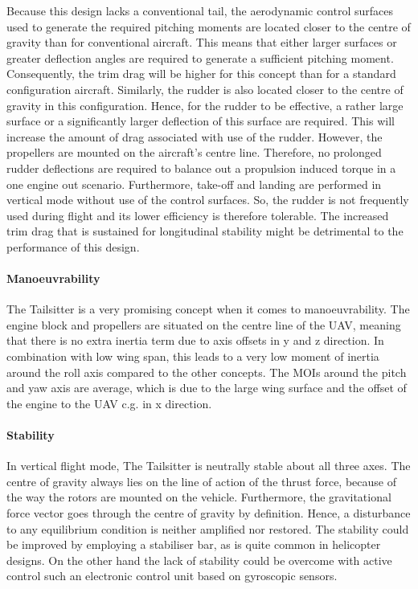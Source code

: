 Because this design lacks a conventional tail, the aerodynamic control surfaces used to generate the required pitching moments are located closer to the centre of gravity than for conventional aircraft. This means that either larger surfaces or greater deflection angles are required to generate a sufficient pitching moment. Consequently, the trim drag will be higher for this concept than for a standard configuration aircraft. Similarly, the rudder is also located closer to the centre of gravity in this configuration. Hence, for the rudder to be effective, a rather large surface or a significantly larger deflection of this surface are required. This will increase the amount of drag associated with use of the rudder. However, the propellers are mounted on the aircraft's centre line. Therefore, no prolonged rudder deflections are required to balance out a propulsion induced torque in a one engine out scenario. Furthermore, take-off and landing are performed in vertical mode without use of the control surfaces. So, the rudder is not frequently used during flight and its lower efficiency is therefore tolerable. The increased trim drag that is sustained for longitudinal stability might be detrimental to the performance of this design. 


\paragraph{Manoeuvrability}

The Tailsitter is a very promising concept when it comes to manoeuvrability. The engine block and propellers are situated on the centre line of the UAV, meaning that there is no extra inertia term due to axis offsets in y and z direction. In combination with low wing span, this leads to a very low moment of inertia around the roll axis compared to the other concepts. The MOIs around the pitch and yaw axis are average, which is due to the large wing surface and the offset of the engine to the UAV c.g. in x direction. 

\paragraph{Stability}

In vertical flight mode, The Tailsitter is neutrally stable about all three axes. The centre of gravity always lies on the line of action of the thrust force, because of the way the rotors are mounted on the vehicle. Furthermore, the gravitational force vector goes through the centre of gravity by definition. Hence, a disturbance to any equilibrium condition is neither amplified nor restored. The stability could be improved by employing a stabiliser bar, as is quite common in helicopter designs. On the other hand the lack of stability could be overcome with active control such an electronic control unit based on gyroscopic sensors.


